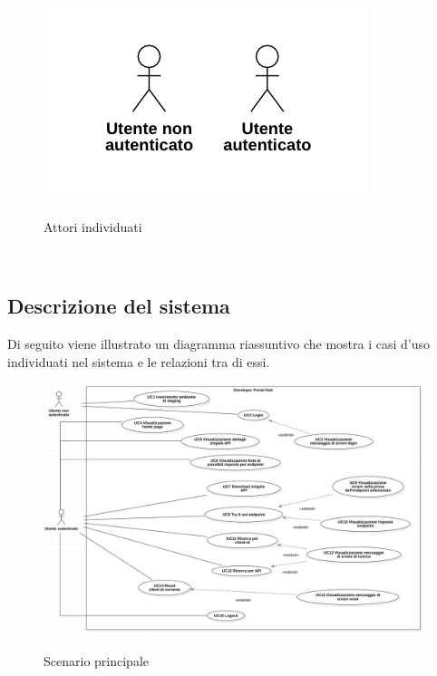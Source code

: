 \begin{figure}[h] 
    \centering 
    \includegraphics[width=0.5\columnwidth, alt={Attori individuati nel sistema}]{images/usecase/attori.jpg}
    \caption{Attori individuati}\label{fig:attori-individuati}
\end{figure}\\



\subsection{Descrizione del sistema}

Di seguito viene illustrato un diagramma riassuntivo che mostra i casi d'uso individuati nel sistema e le relazioni tra di essi.
\begin{figure}[h] 
    \centering 
    \includegraphics[width=0.9\columnwidth, alt={Scenario principale dei casi d'uso individuati}]{images/usecase/riassunto.jpg}
    \caption{Scenario principale}\label{fig:usecase-scenario-principale}
\end{figure}\\



